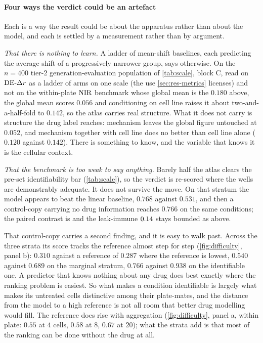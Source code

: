   \paragraph{Four ways the verdict could be an artefact} Each is a way the result
  could be about the apparatus rather than about the model, and each is settled by
  a measurement rather than by argument.
  
  \emph{That there is nothing to learn.} A ladder of mean-shift baselines, each
  predicting the average shift of a progressively narrower group, says
  otherwise. On the $n = 400$ tier-2 generation-evaluation population of \cref{tab:scale}, block C, read on $\textrm{DE-}\Delta r$ as a ladder of arms on one scale (the use \cref{sec:res-metrics} licenses) and not on the within-plate $\textrm{NIR}$ benchmark whose global mean is the $0.180$ above, the global mean scores $0.056$ and conditioning on cell line raises it about
  two-and-a-half-fold to $0.142$, so the atlas carries real structure. What it does
  not carry is structure the drug label reaches: mechanism leaves the global figure
  untouched at $0.052$, and mechanism together with cell line does no better than
  cell line alone ($0.120$ against $0.142$). There is something to know, and the
  variable that knows it is the cellular context.
  
  \emph{That the benchmark is too weak to say anything.} Barely half the atlas
  clears the pre-set identifiability bar (\cref{tab:scale}), so the verdict is
  re-scored where the wells are demonstrably adequate. It does not survive the
  move. On that stratum the model appears to beat the linear baseline, $0.768$
  against $0.531$, and then a control-copy carrying no drug information reaches
  $0.766$ on the same conditions; the paired contrast is
   and the leak-immune $0.14$ stays bounded as above.
  
  That control-copy carries a second finding, and it is easy to walk past. Across
  the three strata its score tracks the reference almost step for step
  (\cref{fig:difficulty}, panel b): $0.310$ against a reference of $0.287$ where
  the reference is lowest, $0.540$ against $0.689$ on the marginal stratum, $0.766$
  against $0.938$ on the identifiable one. A predictor that knows nothing about any
  drug does best exactly where the ranking problem is easiest. So what makes a
  condition identifiable is largely what makes its untreated cells distinctive
  among their plate-mates, and the distance from the model to a high reference is
  not all room that better drug modelling would fill. The reference does rise with
  aggregation (\cref{fig:difficulty}, panel a, within plate: $0.55$ at $4$ cells, $0.58$ at $8$, $0.67$ at $20$); what the strata add is that most of the ranking can be
  done without the drug at all.
  
